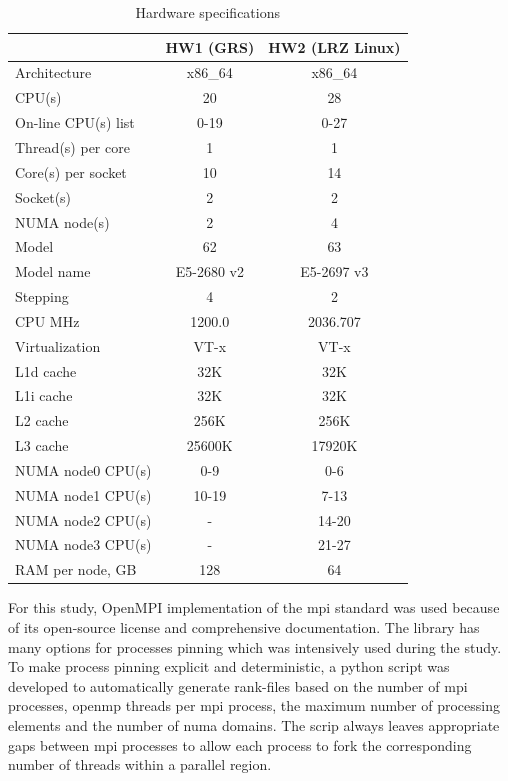 \begin{table}
\centering
\small
\begin{tabular}{|l|c|c|}
\hline
                    & HW1 (GRS) & HW2 (LRZ Linux) \\ \hline
Architecture        & x86\_64 & x86\_64 \\ \hline
CPU(s)              & 20 &  28 \\ \hline
On-line CPU(s) list & 0-19 &  0-27 \\ \hline
Thread(s) per core  & 1 &  1 \\  \hline
Core(s) per socket  & 10 & 14 \\ \hline
Socket(s)           & 2 &  2 \\ \hline
NUMA node(s)        & 2 &  4 \\ \hline
Model               & 62 &  63 \\ \hline
Model name          & E5-2680 v2 & 
E5-2697 v3 \\ \hline
Stepping            & 4 &  2 \\ \hline
CPU MHz             & 1200.0 &  2036.707 \\ \hline
Virtualization      & VT-x &  VT-x \\ \hline
L1d cache           & 32K &  32K \\ \hline
L1i cache           & 32K &  32K \\ \hline
L2 cache            & 256K &  256K \\ \hline
L3 cache            & 25600K &  17920K \\ \hline
NUMA node0 CPU(s)   & 0-9 &  0-6 \\ \hline
NUMA node1 CPU(s)   & 10-19 &  7-13 \\ \hline
NUMA node2 CPU(s)   & - &  14-20 \\ \hline
NUMA node3 CPU(s)   & - &  21-27 \\ \hline
RAM per node, GB   & 128 &  64 \\ \hline
\end{tabular}
\caption{Hardware specifications}
\label{table:hardware-spec}
\end{table}


For this study, OpenMPI implementation of the \acrshort{mpi} standard was used because of its open-source license and comprehensive documentation. The library has many options for processes pinning which was intensively used during the study.\\


To make process pinning explicit and deterministic, a python script was developed to automatically generate rank-files based on the number of \acrshort{mpi} processes, \acrshort{openmp} threads per \acrshort{mpi} process, the maximum number of processing elements and the number of \acrshort{numa} domains. The scrip always leaves appropriate gaps between \acrshort{mpi} processes to allow each process to fork the corresponding number of threads within a parallel region.\\


